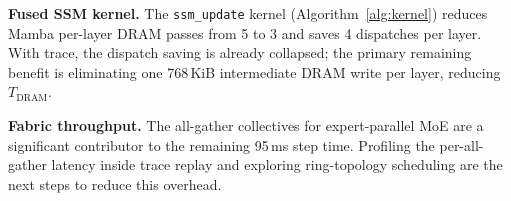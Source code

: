 \textbf{Fused SSM kernel.} The \texttt{ssm\_update} kernel (Algorithm~\ref{alg:kernel}) reduces Mamba per-layer DRAM passes from 5 to 3 and saves 4 dispatches per layer. With trace, the dispatch saving is already collapsed; the primary remaining benefit is eliminating one 768\,KiB intermediate DRAM write per layer, reducing $T_{\mathrm{DRAM}}$.

\textbf{Fabric throughput.} The all-gather collectives for expert-parallel MoE are a significant contributor to the remaining 95\,ms step time. Profiling the per-all-gather latency inside trace replay and exploring ring-topology scheduling are the next steps to reduce this overhead.
